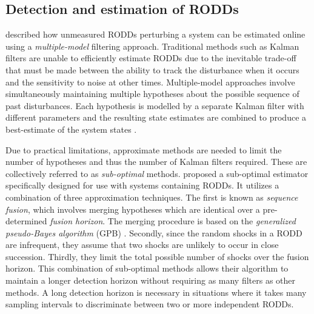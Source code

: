 \subsection{Detection and estimation of RODDs} \label{detection_RODDs}

\cite{robertson_detection_1995} described how unmeasured \gls{RODD}s perturbing a system can be estimated online using a \textit{multiple-model} filtering approach. Traditional methods such as Kalman filters are unable to efficiently estimate \gls{RODD}s due to the inevitable trade-off that must be made between the ability to track the disturbance when it occurs and the sensitivity to noise at other times. Multiple-model approaches involve simultaneously maintaining multiple hypotheses about the possible sequence of past disturbances. Each hypothesis is modelled by a separate Kalman filter with different parameters and the resulting state estimates are combined to produce a best-estimate of the system states \citep{jaffer_estimation_1971, buxbaum_recursive_1969, tugnait_detection_1982}.

Due to practical limitations, approximate methods are needed to limit the number of hypotheses and thus the number of Kalman filters required. These are collectively referred to as \textit{sub-optimal} methods. \cite{robertson_detection_1995} proposed a sub-optimal estimator specifically designed for use with systems containing \gls{RODD}s. It utilizes a combination of three approximation techniques. The first is known as \textit{sequence fusion}, which involves merging hypotheses which are identical over a pre-determined \textit{fusion horizon}. The merging procedure is based on the \textit{generalized pseudo-Bayes algorithm} (\gls{GPB}) \citep{buxbaum_recursive_1969, jaffer_estimation_1971, tugnait_detection_1982, gustafsson_estimation_1993}. Secondly, since the random shocks in a \gls{RODD} are infrequent, they assume that two shocks are unlikely to occur in close succession. Thirdly, they limit the total possible number of shocks over the fusion horizon. This combination of sub-optimal methods allows their algorithm to maintain a longer detection horizon without requiring as many filters as other methods. A long detection horizon is necessary in situations where it takes many sampling intervals to discriminate between two or more independent \gls{RODD}s.

